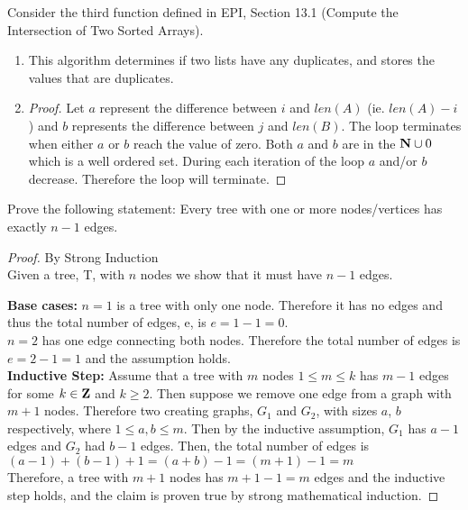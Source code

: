 \documentclass{article}
\author{Elliott Pryor}
\date{due: 6 September 2019}
\begin{document}
\nextprob
Consider the third function defined in EPI, Section 13.1 (Compute the
Intersection of Two Sorted Arrays).
\begin{enumerate}
    \item This algorithm determines if two lists have any duplicates, and stores the values that are duplicates.
    \item 
\begin{proof}
Let $a$ represent the difference between $i$ and $len(A)$ (ie. $len(A) - i$) and $b$ represents the difference between $j$ and $len(B)$. The loop terminates when either $a$ or $b$ reach the value of zero. Both $a$ and $b$ are in the $\mathbf{N} \cup 0$ which is a well ordered set. During each iteration of the loop $a$ and/or $b$ decrease. Therefore the loop will terminate. 
\end{proof}    
    
\end{enumerate}

\nextprob
Prove the following statement: Every tree with one or more nodes/vertices has
exactly $n-1$ edges.

\begin{proof} By Strong Induction\\
Given a tree, T, with $n$ nodes we show that it must have $n-1$ edges. 

\textbf{Base cases: } $n = 1$ is a tree with only one node. Therefore it has no edges and thus the total number of edges, e, is $e = 1 - 1 = 0$.\\
$n = 2$ has one edge connecting both nodes. Therefore the total number of edges is $e = 2 - 1 = 1$ and the assumption holds.\\

\textbf{Inductive Step: } Assume that a tree with $m$ nodes $1 \leq m \leq k$ has $m - 1$ edges for some $k \in \mathbf{Z}$ and $k \geq 2$. Then suppose we remove one edge from a graph with $m + 1$ nodes. Therefore two creating graphs, $G_1$ and $G_2$, with sizes $a$, $b$ respectively, where $1 \leq a,b \leq m$. Then by the inductive assumption, $G_1$ has $a-1$ edges and $G_2$ had $b-1$ edges. Then, the total number of edges is\\
$(a-1) + (b-1) + 1 = (a + b) - 1 = (m + 1) - 1 = m$\\
Therefore, a tree with $m + 1$ nodes has $m + 1 - 1 = m$ edges and the inductive step holds, and the claim is proven true by strong mathematical induction. 
\end{proof}
\end{document}
